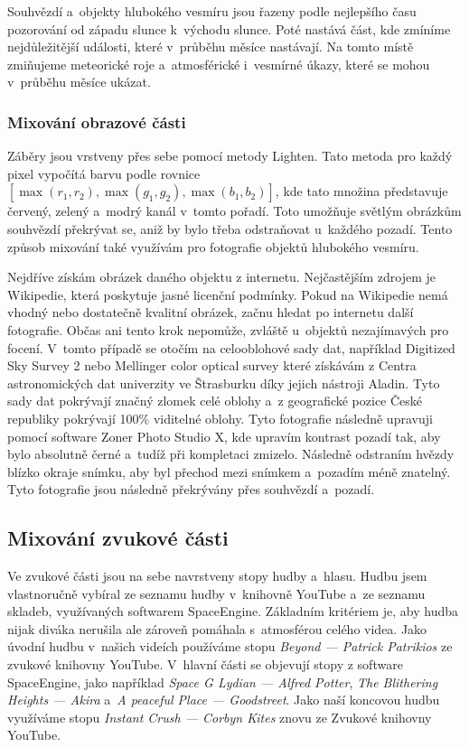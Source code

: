 \documentclass[12pt,a4paper,titlepage]{article}
\begin{document}
Souhvězdí a~objekty hlubokého vesmíru jsou řazeny podle nejlepšího času pozorování od západu slunce k~východu slunce. Poté nastává část, kde zmíníme nejdůležitější události, které v~průběhu měsíce nastávají. Na tomto místě zmiňujeme meteorické roje a~atmosférické i~vesmírné úkazy, které se mohou v~průběhu měsíce ukázat.
\subsubsection{Mixování obrazové části}
Záběry jsou vrstveny přes sebe pomocí metody Lighten. Tato metoda pro každý pixel vypočítá barvu podle rovnice $[\max(r_1, r_2), \max(g_1, g_2), \max(b_1, b_2)]$, kde tato množina představuje červený, zelený a~modrý kanál v~tomto pořadí. Toto umožňuje světlým obrázkům souhvězdí překrývat se, aniž by bylo třeba odstraňovat u~každého pozadí. Tento způsob mixování také využívám pro fotografie objektů hlubokého vesmíru. 

Nejdříve získám obrázek daného objektu z internetu. Nejčastějším zdrojem je Wikipedie, která poskytuje jasné licenční podmínky. Pokud na Wikipedie nemá vhodný nebo dostatečně kvalitní obrázek, začnu hledat po internetu další fotografie. Občas ani tento krok nepomůže, zvláště u~objektů nezajímavých pro focení. V~tomto případě se otočím na celooblohové sady dat, například Digitized Sky Survey 2 nebo Mellinger color optical survey které získávám z Centra astronomických dat univerzity ve Štrasburku díky jejich nástroji Aladin. Tyto sady dat pokrývají značný zlomek celé oblohy a~z geografické pozice České republiky pokrývají 100\% viditelné oblohy. Tyto fotografie následně upravuji pomocí software Zoner Photo Studio X, kde upravím kontrast pozadí tak, aby bylo absolutně černé a~tudíž při kompletaci zmizelo. Následně odstraním hvězdy blízko okraje snímku, aby byl přechod mezi snímkem a~pozadím méně znatelný. Tyto fotografie jsou následně překrývány přes souhvězdí a~pozadí. 
\subsection{Mixování zvukové části}
Ve zvukové části jsou na sebe navrstveny stopy hudby a~hlasu. Hudbu jsem vlastnoručně vybíral ze seznamu hudby v~knihovně YouTube a~ze seznamu skladeb, využívaných softwarem SpaceEngine. Základním kritériem je, aby hudba nijak diváka nerušila ale zároveň pomáhala s~atmosférou celého videa. Jako úvodní hudbu v~našich videích používáme stopu \textit{Beyond --- Patrick Patrikios} ze zvukové knihovny YouTube. V~hlavní části se objevují stopy z software SpaceEngine, jako například \textit{Space G Lydian --- Alfred Potter}, \textit{The Blithering Heights --- Akira} a~\textit{A peaceful Place --- Goodstreet}. Jako naší koncovou hudbu využíváme stopu \textit{Instant Crush --- Corbyn Kites} znovu ze Zvukové knihovny YouTube.
\end{document}
